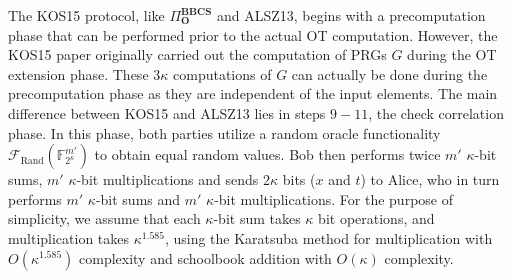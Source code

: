 The KOS15 protocol, like $\Pi^{\textbf{BBCS}}_{\textbf{O}}$ and ALSZ13, begins with a precomputation phase that can be performed prior to the actual OT computation. However, the KOS15 paper \cite{KOS15} originally carried out the computation of PRGs $G$ during the OT extension phase. These $3\kappa$ computations of $G$ can actually be done during the precomputation phase as they are independent of the input elements. The main difference between KOS15 and ALSZ13 lies in steps $9-11$, the check correlation phase. In this phase, both parties utilize a random oracle functionality $\mathcal{F}_{\text{Rand}}(\mathbb{F}^{m'}_{2^\kappa})$ to obtain equal random values. Bob then performs twice $m'$ $\kappa$-bit sums, $m'$ $\kappa$-bit multiplications and sends $2\kappa$ bits ($x$ and $t$) to Alice, who in turn performs $m'$ $\kappa$-bit sums and $m'$ $\kappa$-bit multiplications. For the purpose of simplicity, we assume that each $\kappa$-bit sum takes $\kappa$ bit operations, and multiplication takes $\kappa^{1.585}$, using the Karatsuba method for multiplication with $O(\kappa^{1.585})$ complexity and schoolbook addition with $O(\kappa)$ complexity.

